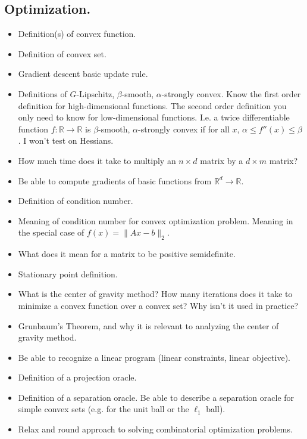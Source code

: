 \documentclass[10pt]{article}
\newcommand{\R}{\mathbb{R}}
\begin{document}
\subsection{Optimization.}
\begin{itemize}
	\item Definition(s) of convex function.
	\item Definition of convex set.
	\item Gradient descent basic update rule. 
	\item Definitions of $G$-Lipschitz, $\beta$-smooth, $\alpha$-strongly convex. Know the first order definition for high-dimensional functions. The second order definition you only need to know for low-dimensional functions. I.e. a twice differentiable function $f:\R\rightarrow \R$ is $\beta$-smooth, $\alpha$-strongly convex if for all $x$, $\alpha \leq f''(x) \leq \beta$. I won't test on Hessians.
	\item How much time does it take to multiply an $n\times d$ matrix by a $d \times m$ matrix?
	\item Be able to compute gradients of basic functions from $\R^d \rightarrow \R$. 
	\item Definition of condition number.
	\item Meaning of condition number for convex optimization problem. Meaning in the special case of $f(x) = \|Ax - b\|_2$. 
	\item What does it mean for a matrix to be positive semidefinite.
	\item Stationary point definition. 
	\item What is the center of gravity method? How many iterations does it take to minimize a convex function over a convex set? Why isn't it used in practice?
	\item Grunbaum's Theorem, and why it is relevant to analyzing the center of gravity method.
	\item Be able to recognize a linear program (linear constraints, linear objective).
	\item Definition of a projection oracle.
	\item Definition of a separation oracle. Be able to describe a separation oracle for simple convex sets (e.g. for the unit ball or the $\ell_1$ ball). 
	\item  Relax and round approach to solving combinatorial optimization problems.
\end{itemize}
\end{document}
